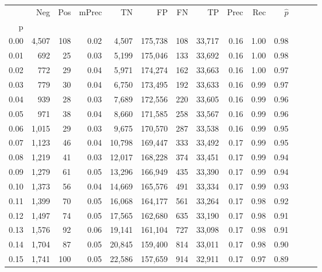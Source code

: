\begin{tabular}{rrrrrrrrrrrrrr}
\toprule
{} &    Neg &    Pos & mPrec &       TN &       FP &      FN &      TP &  Prec &   Rec & $\hat{p}$ \\
p    &        &        &       &          &          &         &         &       &       &           \\
\midrule
0.00 &  4,507 &    108 &  0.02 &    4,507 &  175,738 &     108 &  33,717 &  0.16 &  1.00 &      0.98 \\
0.01 &    692 &     25 &  0.03 &    5,199 &  175,046 &     133 &  33,692 &  0.16 &  1.00 &      0.98 \\
0.02 &    772 &     29 &  0.04 &    5,971 &  174,274 &     162 &  33,663 &  0.16 &  1.00 &      0.97 \\
0.03 &    779 &     30 &  0.04 &    6,750 &  173,495 &     192 &  33,633 &  0.16 &  0.99 &      0.97 \\
0.04 &    939 &     28 &  0.03 &    7,689 &  172,556 &     220 &  33,605 &  0.16 &  0.99 &      0.96 \\
0.05 &    971 &     38 &  0.04 &    8,660 &  171,585 &     258 &  33,567 &  0.16 &  0.99 &      0.96 \\
0.06 &  1,015 &     29 &  0.03 &    9,675 &  170,570 &     287 &  33,538 &  0.16 &  0.99 &      0.95 \\
0.07 &  1,123 &     46 &  0.04 &   10,798 &  169,447 &     333 &  33,492 &  0.17 &  0.99 &      0.95 \\
0.08 &  1,219 &     41 &  0.03 &   12,017 &  168,228 &     374 &  33,451 &  0.17 &  0.99 &      0.94 \\
0.09 &  1,279 &     61 &  0.05 &   13,296 &  166,949 &     435 &  33,390 &  0.17 &  0.99 &      0.94 \\
0.10 &  1,373 &     56 &  0.04 &   14,669 &  165,576 &     491 &  33,334 &  0.17 &  0.99 &      0.93 \\
0.11 &  1,399 &     70 &  0.05 &   16,068 &  164,177 &     561 &  33,264 &  0.17 &  0.98 &      0.92 \\
0.12 &  1,497 &     74 &  0.05 &   17,565 &  162,680 &     635 &  33,190 &  0.17 &  0.98 &      0.91 \\
0.13 &  1,576 &     92 &  0.06 &   19,141 &  161,104 &     727 &  33,098 &  0.17 &  0.98 &      0.91 \\
0.14 &  1,704 &     87 &  0.05 &   20,845 &  159,400 &     814 &  33,011 &  0.17 &  0.98 &      0.90 \\
0.15 &  1,741 &    100 &  0.05 &   22,586 &  157,659 &     914 &  32,911 &  0.17 &  0.97 &      0.89 \\

\end{tabular}
